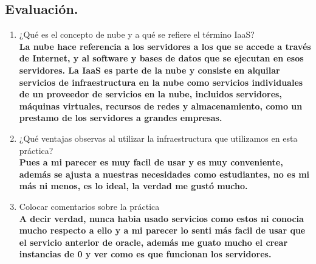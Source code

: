 \documentclass[12pt]{article}
\begin{document}
{\color{blue} \subsection*{\textbf{Evaluación.}}}
\vspace{1em}
\begin{enumerate}
    \item ¿Qué es el concepto de nube y a qué se refiere el término IaaS?\\
    \textbf{La nube hace referencia a los servidores a los que se accede a través de Internet, y al software y bases de datos que se ejecutan en esos servidores.
    La IaaS es parte de la nube y consiste en alquilar servicios de infraestructura en la nube como servicios individuales de un proveedor de servicios en la nube, incluidos servidores, máquinas virtuales, recursos de redes y almacenamiento, como un prestamo de los servidores a grandes empresas. }
    \item ¿Qué ventajas observas al utilizar la infraestructura que utilizamos en esta práctica?\\
    \textbf{Pues a mi parecer es muy facil de usar y es muy conveniente, además se ajusta a nuestras necesidades como estudiantes, no es mi más ni menos, es lo ideal, la verdad me gustó mucho.}
    \item Colocar comentarios sobre la práctica\\
    \textbf{A decir verdad, nunca habia usado servicios como estos ni conocia mucho respecto a ello y a mi parecer lo senti más facil de usar que el servicio anterior de oracle, además me guato mucho el crear instancias de 0 y ver como es que funcionan los servidores.}
\end{enumerate}
\end{document}
